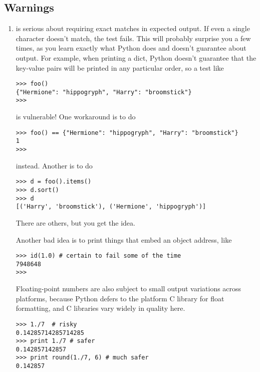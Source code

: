 \subsection{Warnings}

\begin{enumerate}

\item {} is serious about requiring exact matches in expected
  output.  If even a single character doesn't match, the test fails.  This
  will probably surprise you a few times, as you learn exactly what Python
  does and doesn't guarantee about output.  For example, when printing a
  dict, Python doesn't guarantee that the key-value pairs will be printed
  in any particular order, so a test like

\begin{verbatim}
>>> foo()
{"Hermione": "hippogryph", "Harry": "broomstick"}
>>>
\end{verbatim}

is vulnerable!  One workaround is to do

\begin{verbatim}
>>> foo() == {"Hermione": "hippogryph", "Harry": "broomstick"}
1
>>>
\end{verbatim}

instead.  Another is to do

\begin{verbatim}
>>> d = foo().items()
>>> d.sort()
>>> d
[('Harry', 'broomstick'), ('Hermione', 'hippogryph')]
\end{verbatim}

There are others, but you get the idea.

Another bad idea is to print things that embed an object address, like

\begin{verbatim}
>>> id(1.0) # certain to fail some of the time
7948648
>>>
\end{verbatim}

Floating-point numbers are also subject to small output variations across
platforms, because Python defers to the platform C library for float
formatting, and C libraries vary widely in quality here.

\begin{verbatim}
>>> 1./7  # risky
0.14285714285714285
>>> print 1./7 # safer
0.142857142857
>>> print round(1./7, 6) # much safer
0.142857
\end{verbatim}


\end{enumerate}
